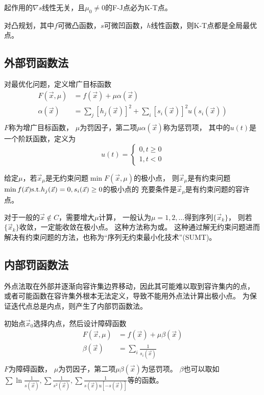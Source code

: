 \begin{theorem}
    起作用的$\nabla s$线性无关，且$\mu_0\neq 0$的F-J点必为K-T点。
\end{theorem}

\begin{theorem}
    对凸规划，其中$f$可微凸函数，$s$可微凹函数，$h$线性函数，则K-T点都是全局最优点。
\end{theorem}

\subsection{外部罚函数法}
对最优化问题，定义增广目标函数
\[
    \begin{split}
        F(\vec{x},\mu) &= f(\vec{x}) + \mu \alpha(\vec{x}) \\
        \alpha(\vec{x}) &= \sum_j [h_j (\vec{x})]^2 + \sum_i [s_i(\vec{x})]^2 u(s_i(\vec{x})) \\
    \end{split}
\]
$F$称为增广目标函数，
$\mu$为罚因子，第二项$\mu\alpha(\vec{x})$称为惩罚项，
其中的$u(t)$是一个阶跃函数，定义为
\[
    u(t)=\begin{cases}0,t \geq 0\\1,t<0\end{cases}
\]

\begin{theorem}
    给定$\mu$，若$\vec{x}_\mu$是无约束问题$\min F(\vec{x},\mu)$的极小点，
    则$\vec{x}_\mu$是有约束问题$\min f(\vec{x}) \mathrm{s.t.} h_j(\vec{x})=0, s_i(\vec{x})\geq 0$的极小点的
    充要条件是$\vec{x}_\mu$是有约束问题的容许点。
\end{theorem}

对于一般的$\vec{x}\notin C$，需要增大$\mu$计算，
一般认为$\mu=1,2,\dots$得到序列$\{\vec{x}_k\}$，
则若$\{\vec{x}_k\}$收敛，一定能收敛在极小点。
这种方法称为或。
这种通过解无约束问题进而解决有约束问题的方法，也称为``序列无约束最小化技术''(SUMT)。

\subsection{内部罚函数法}
外点法取在外部并逐渐向容许集边界移动，因此其可能难以取到容许集内的点，
或者可能函数在容许集外根本无法定义，导致不能用外点法计算出极小点。
为保证迭代点总是内点，则产生了内部罚函数法。

初始点$\vec{x}_0$选择内点，然后设计障碍函数
\[
    \begin{split}
        F(\vec{x},\mu) &= f(\vec{x}) + \mu\beta(\vec{x}) \\
        \beta(\vec{x}) &= \sum_i \frac{1}{s_i(\vec{x})} \\
    \end{split}
\]
$F$为障碍函数，
$\mu$为罚因子，第二项$\mu\beta(\vec{x})$为惩罚项。
$\beta$也可以取如$\sum\ln \frac{1}{s(\vec{x})}, \sum \frac{1}{s^2(\vec{x})}, \sum\frac{1}{s(\vec{x}) u[-s(\vec{x})]}$等的函数。

